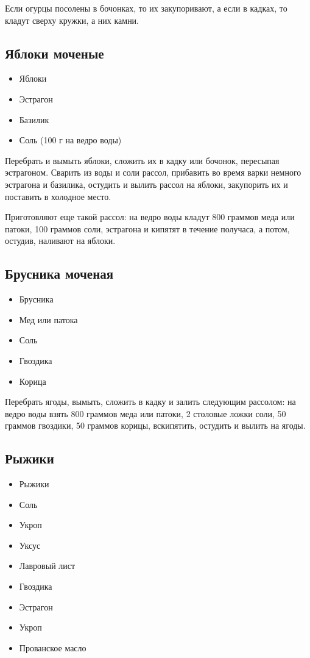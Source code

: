 Если огурцы посолены в бочонках, то их закупоривают, а если в кадках, то кладут сверху кружки, а них камни.

\subsection{Яблоки моченые}

\begin{itemize}
	\item Яблоки
    \item Эстрагон
    \item Базилик
    \item Соль (100 г на ведро воды)
\end{itemize}

Перебрать и вымыть яблоки, сложить их в кадку или бочонок, пересыпая эстрагоном. Сварить из воды и соли рассол, прибавить во время варки немного эстрагона и базилика, остудить и вылить рассол на яблоки, закупорить их и поставить в холодное место.

Приготовляют еще такой рассол: на ведро воды кладут 800 граммов меда или патоки, 100 граммов соли, эстрагона и кипятят в течение получаса, а потом, остудив, наливают на яблоки.

\subsection{Брусника моченая}

\begin{itemize}
	\item Брусника
    \item Мед или патока 
    \item Соль
    \item Гвоздика 
    \item Корица
\end{itemize}

Перебрать ягоды, вымыть, сложить в кадку и залить следующим рассолом: на ведро воды взять 800 граммов меда или патоки, 2 столовые ложки соли, 50 граммов гвоздики, 50 граммов корицы, вскипятить, остудить и вылить на ягоды.

\subsection{Рыжики}

\begin{itemize}
	\item Рыжики
    \item Соль
    \item Укроп
    \item Уксус
    \item Лавровый лист
    \item Гвоздика
    \item Эстрагон
    \item Укроп
    \item Прованское масло
\end{itemize}

